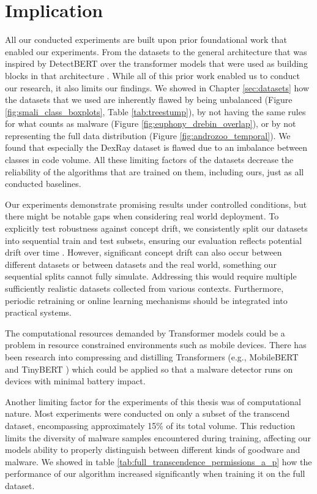 \section{Implication}

All our conducted experiments are built upon prior foundational work that enabled our experiments. 
From the datasets \cite{drebin, transcend, dexray} to the general architecture that was 
inspired by DetectBERT \cite{detectbert} over the transformer models 
that were used as building blocks in that architecture \cite{modernbert,bigbird,longformer}. 
While all of this prior work enabled us to conduct our research, it also limits our findings. 
We showed in Chapter \ref{sec:datasets} how the datasets that we used are inherently flawed by 
being unbalanced (Figure \ref{fig:smali_class_boxplots}, Table \ref{tab:treestump}), 
by not having the same rules for what counts as malware (Figure \ref{fig:euphony_drebin_overlap}), 
or by not representing the full data distribution (Figure \ref{fig:androzoo_temporal}). 
We found that especially the DexRay \cite{dexray} dataset is flawed due to an imbalance between classes in 
code volume. 
All these limiting factors of the datasets decrease the reliability of the algorithms 
that are trained on them, including ours, just as all conducted baselines.

Our experiments demonstrate promising results under controlled conditions, 
but there might be notable gaps when considering real world deployment. 
To explicitly test robustness against concept drift, 
we consistently split our datasets into sequential train and test subsets, 
ensuring our evaluation reflects potential drift over time \cite{tesseract}. 
However, significant concept drift can also occur between different datasets or between 
datasets and the real world, something our sequential splits cannot fully simulate. 
Addressing this would require multiple sufficiently realistic datasets collected from various 
contexts. 
Furthermore, periodic retraining or online learning mechanisms should be integrated 
into practical systems. 

The computational resources demanded by Transformer models could be a problem 
in resource constrained environments such as mobile devices. 
There has been research into compressing and distilling Transformers 
(e.g., MobileBERT \cite{mobilebert} and TinyBERT \cite{tinybert}) 
which could be applied so that a malware detector runs on devices with minimal battery impact. 

Another limiting factor for the experiments of this thesis was of computational nature.
Most experiments were conducted on only a subset of the transcend dataset, 
encompassing approximately 15\% of its total volume. 
This reduction limits the diversity of malware samples encountered during training, 
affecting our models ability to properly distinguish between different kinds of goodware and malware. 
We showed in table \ref{tab:full_transcendence_permissions_a_p} how the
performance of our algorithm increased significantly when training it on the full dataset.

